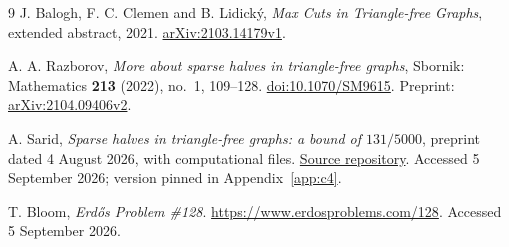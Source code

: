 \documentclass[12pt]{article}
\begin{document}
\begin{thebibliography}{9}
J. Balogh, F. C. Clemen and B. Lidick\'y,
\emph{Max Cuts in Triangle-free Graphs}, extended abstract, 2021.
\href{https://arxiv.org/abs/2103.14179v1}{arXiv:2103.14179v1}.

A. A. Razborov, \emph{More about sparse halves in triangle-free graphs},
Sbornik: Mathematics \textbf{213} (2022), no.~1, 109--128.
\href{https://doi.org/10.1070/SM9615}{doi:10.1070/SM9615}.
Preprint: \href{https://arxiv.org/abs/2104.09406v2}{arXiv:2104.09406v2}.

A. Sarid, \emph{Sparse halves in triangle-free graphs: a bound of
$131/5000$}, preprint dated 4 August 2026, with computational files.
\href{https://github.com/aimir/erdos-128-sparse-halves}{Source repository}.
Accessed 5 September 2026; version pinned in Appendix~\ref{app:c4}.

T. Bloom, \emph{Erd\H{o}s Problem \#128}.
\url{https://www.erdosproblems.com/128}.
Accessed 5 September 2026.
\end{thebibliography}
\end{document}
